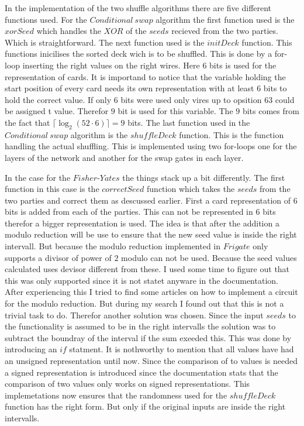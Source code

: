 In the implementation of the two shuffle algorithms there are five different functions used. For the $Conditional~swap$ algorithm the first function used is the $xorSeed$ which handles the $XOR$ of the $seeds$ recieved from the two parties. Which is straightforward. The next function used is the $initDeck$ function. This functions inicilises the sorted deck wich is to be shuffled. This is done by a for-loop inserting the right values on the right wires. Here $6$ bits is used for the representation of cards. It is importand to notice that the variable holding the start position of every card needs its own representation with at least $6$ bits to hold the correct value. If only $6$ bits were used only vires up to opsition $63$ could be assigned t value. Therefor $9$ bit is used for this variable. The $9$ bits comes from the fact that $\lceil \log_2(52\cdot 6)\rceil=9$ bits. The last function used in the $Conditional~swap$ algorithm is the $shuffleDeck$ function. This is the function handling the actual shuffling. This is implemented using two for-loops one for the layers of the network and another for the swap gates in each layer.

\bigskip

In the case for the $Fisher\text{-}Yates$ the things stack up a bit differently. The first function in this case is the $correctSeed$ function which takes the $seeds$ from the two parties and correct them as descussed earlier. First a card representation of $6$ bits is added from each of the parties. This can not be represented in $6$ bits therefor a bigger representation is used. The idea is that after the addition a modulo reduction will be use to ensure that the new seed value is inside the right intervall. But because the modulo reduction implemented in $Frigate$ only supports a divisor of power of $2$ modulo can not be used. Because the seed values calculated uses devisor different from these. I used some time to figure out that this was only supported since it is not statet anyware in the documentation. After experiencing this I tried to find some articles on how to implement a circuit for the modulo reduction. But during my search I found out that this is not a trivial task to do. Therefor another solution was chosen. Since the input $seeds$ to the functionality is assumed to be in the right intervalls the solution was to subtract the boundray of the interval if the sum exeeded this. This was done by introducing an $if$ statment. It is nothworthy to mention that all values have had an unsigned representation until now. Since the comparison of to values is needed a signed representation is introduced since the documentation stats that the comparison of two values only works on signed representations. This implemetations now ensures that the randomness used for the $shuffleDeck$ function has the right form. But only if the original inputs are inside the right intervalls.

